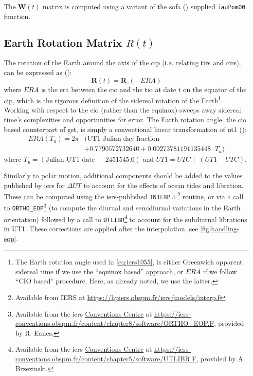The $\bm{W}(t)$ matrix is computed using a variant of the \gls{sofa} (\cite{SOFA20210125}) 
supplied \texttt{iauPom00} function.

\subsection{Earth Rotation Matrix $R(t)$}
\label{ssec:earth-rotation-matrix}
The rotation of the Earth around the axis of the \gls{cip} (i.e. relating 
\gls{tirs} and \gls{cirs}), can be expressed as (\cite{iers2010}):
\begin{equation}
  \bm{R}(t) = \bm{R}_z (-ERA)
  \label{eq:iers1055}
\end{equation}
where $ERA$ is the \gls{era} between the \gls{cio} and the \gls{tio} 
at date $t$ on the equator of the \gls{cip}, which is the rigorous definition 
of the sidereal rotation of the Earth\footnote{The Earth rotation angle used in 
\ref{eq:iers1055}, is either Greenwich apparent sidereal time if we use the 
``equinox based'' approach, or $ERA$ if we follow ``CIO based'' procedure. Here, 
as already noted, we use the latter.}. Working with respect to the \gls{cio} 
(rather than the equinox) sweeps away sidereal time's complexities and opportunities 
for error. The Earth rotation angle, the \gls{cio} based counterpart of \gls{gst},
is simply a conventional linear transformation of \gls{ut1} (\cite{sofa_18141_eacb}):
\begin{equation}
  \label{eq:iers10515}
  \begin{split}
    ERA(T_u) = 2 \pi & ( \text{UT1 Julian day fraction } \\
                     & + 0.7790572732640 + 0.00273781191135448 \cdot T_u )
    \end{split}
\end{equation}
where $T_u = \left( \text{Julian UT1 date } - 2451545.0 \right)$ and 
$UT1=UTC+(UT1-UTC)$. 

Similarly to polar motion, additional components should 
be added to the values published by \gls{iers} for $\Delta UT$ to account for 
the effects of ocean tides and libration. These can be computed using the 
\gls{iers}-published \texttt{INTERP.F}\footnote{Available from IERS at \url{https://hpiers.obspm.fr/iers/models/interp.f}} 
routine, or via a call to \texttt{ORTHO\_EOP}\footnote{Available from the \gls{iers} \href{https://iers-conventions.obspm.fr/}{Conventions Centre} at \url{https://iers-conventions.obspm.fr/content/chapter8/software/ORTHO_EOP.F}, provided by R. Eanes.} 
(to compute the diurnal and semidiurnal variations in the Earth orientation) 
followed by a call to \texttt{UTLIBR}\footnote{Available from the \gls{iers} \href{https://iers-conventions.obspm.fr/}{Conventions Centre} at \url{https://iers-conventions.obspm.fr/content/chapter5/software/UTLIBR.F}, provided by A. Brzezinski.} 
to account for the subdiurnal librations in UT1. These corrections are applied 
after the interpolation, see \ref{fig:handling-eop}.

